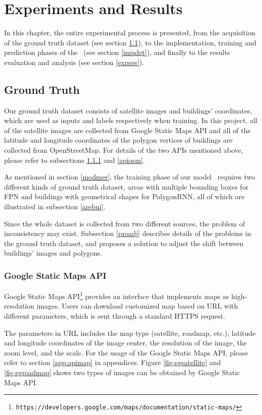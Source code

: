 \chapter{Experiments and Results}

In this chapter, the entire experimental process is presented, from the acquisition of the ground truth dataset (see section \ref{gt}), to the implementation, training and prediction phases of the \modelnameshort\ (see section \ref{impdet}), and finally to the results evaluation and analysis (see section \ref{expres}).

\section{Ground Truth}\label{gt}

Our ground truth dataset consists of satellite images and buildings' coordinates, which are used as inputs and labels respectively when training. In this project, all of the satellite images are collected from Google Static Maps API and all of the latitude and longitude coordinates of the polygon vertices of buildings are collected from OpenStreetMap. For details of the two APIs mentioned above, please refer to subsections \ref{apimap} and \ref{apiosm}.

As mentioned in section \ref{modmer}, the training phase of our model \modelnameshort\ requires two different kinds of ground truth dataset, areas with multiple bounding boxes for FPN and buildings with geometrical shapes for PolygonRNN, all of which are illustrated in subsection \ref{arebui}.

Since the whole dataset is collected from two different sources, the problem of inconsistency may exist. Subsection \ref{proadj} describes details of the problems in the ground truth dataset, and proposes a solution to adjust the shift between buildings' images and polygons.

\subsection{Google Static Maps API}\label{apimap}

Google Static Maps API\footnote{\lstinline{https://developers.google.com/maps/documentation/static-maps/}} provides an interface that implements maps as high-resolution images. Users can download customized map based on URL with different parameters, which is sent through a standard HTTPS request.

The parameters in URL includes the map type (satellite, roadmap, etc.), latitude and longitude coordinates of the image center, the resolution of the image, the zoom level, and the scale. For the usage of the Google Static Maps API, please refer to section \ref{app:apimap} in appendices. Figure \ref{fig:egsatellite} and \ref{fig:egroadmap} shows two types of images can be obtained by Google Static Maps API.

